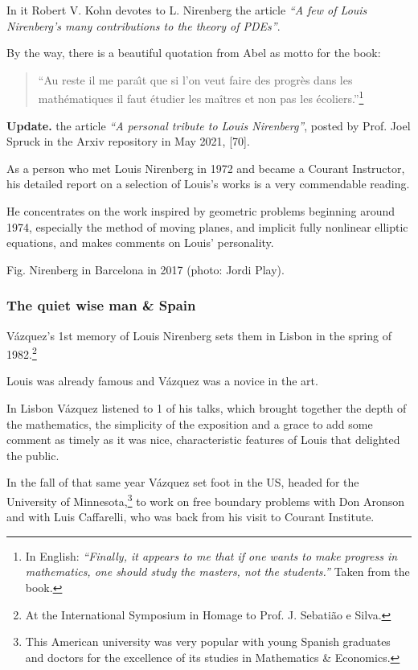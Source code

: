 \documentclass{article}
\begin{document}
In it Robert V. Kohn devotes to L. Nirenberg the article \textit{``A few of Louis Nirenberg's many contributions to the theory of PDEs''}.

By the way, there is a beautiful quotation from Abel as motto for the book:
\begin{quotation}
	``Au reste il me para\^{\i}t que si l'on veut faire des progr\`es dans les math\'ematiques il faut \'etudier les maîtres et non pas les \'ecoliers.''\footnote{In English: \textit{``Finally, it appears to me that if one wants to make progress in mathematics, one should study the masters, not the students.''} Taken from the book.}
\end{quotation}
\textbf{Update.} the article \textit{``A personal tribute to Louis Nirenberg''}, posted by Prof. Joel Spruck in the Arxiv repository in May 2021, [70].

As a person who met Louis Nirenberg in 1972 and became a Courant Instructor, his detailed report on a selection of Louis's works is a very commendable reading.

He concentrates on the work inspired by geometric problems beginning around 1974, especially the method of moving planes, and implicit fully nonlinear elliptic equations, and makes comments on Louis' personality.

\textsf{Fig. Nirenberg in Barcelona in 2017 (photo: Jordi Play).}

\subsubsection{The quiet wise man \& Spain}
V\'azquez's 1st memory of Louis Nirenberg sets them in Lisbon in the spring of 1982.\footnote{At the International Symposium in Homage to Prof. J. Sebati\~ao e Silva.}

Louis was already famous and V\'azquez was a novice in the art.

In Lisbon V\'azquez listened to 1 of his talks, which brought together the depth of the mathematics, the simplicity of the exposition and a grace to add some comment as timely as it was nice, characteristic features of Louis that delighted the public.

%
In the fall of that same year V\'azquez set foot in the US, headed for the University of Minnesota,\footnote{This American university was very popular with young Spanish graduates and doctors for the excellence of its studies in Mathematics \& Economics.} to work on free boundary problems with Don Aronson and with Luis Caffarelli, who was back from his visit to Courant Institute.
\end{document}
